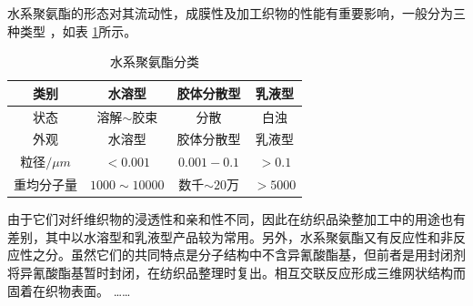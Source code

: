 水系聚氨酯的形态对其流动性，成膜性及加工织物的性能有重要影响，一般分为三种类型 ，如表 \ref{tab:category}所示。

\begin{table}[!hbt]
  \centering
  \caption{水系聚氨酯分类} \label{tab:category}
  
  \begin{tabular*}{0.9\textwidth}{@{\extracolsep{\fill}}cccc}
  \toprule
    类别			&水溶型		&胶体分散型		&乳液型 \\
  \midrule
    状态			&溶解$\sim$胶束	&分散		&白浊 \\
    外观			&水溶型		&胶体分散型		&乳液型 \\
    粒径$/\mu m$	&$<0.001$		&$0.001-0.1$		&$>0.1$ \\
    重均分子量	&$1000\sim 10000$	&数千$\sim 20万$ &$>5000$ \\
  \bottomrule
  \end{tabular*}
\end{table}

由于它们对纤维织物的浸透性和亲和性不同，因此在纺织品染整加工中的用途也有差别，其中以水溶型和乳液型产品较为常用。另外，水系聚氨酯又有反应性和非反应性之分。虽然它们的共同特点是分子结构中不含异氰酸酯基，但前者是用封闭剂将异氰酸酯基暂时封闭，在纺织品整理时复出。相互交联反应形成三维网状结构而固着在织物表面。
……
\fi
